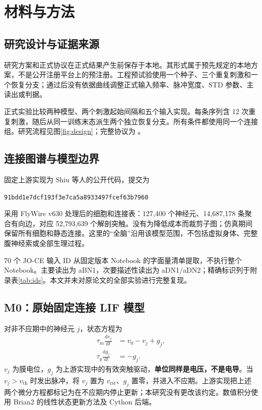 \section{材料与方法}
\label{sec:methods}
\subsection{研究设计与证据来源}
研究方案和正式协议在正式结果产生前保存于本地。其形式属于预先规定的本地方案，不是公开注册平台上的预注册。工程预试验使用一个种子、三个重复刺激和一个恢复分支；通过后没有依据曲线调整正式输入频率、脉冲宽度、STD 参数、主读出或判据。

正式实验比较两种模型、两个刺激起始间隔和五个输入实现。每条序列含 12 次重复刺激，随后从同一训练末态派生两个独立恢复分支。所有条件都使用同一个连接组。研究流程见图\ref{fig:design}；完整协议为 。



\subsection{连接图谱与模型边界}
固定上游实现为 Shiu 等人的公开代码\citep{shiu2024}，提交为
\begin{center}\small\texttt{91bdd1e7dcf193f3e7ca5a8933497fcef63b7960}\end{center}
采用 FlyWire v630 处理后的细胞和连接表：127,400 个神经元、14,687,178 条聚合有向边，对应 52,793,639 个解剖突触。没有为降低成本而裁剪子图；仿真期间保留所有细胞和静态连接。这里的“全脑”沿用该模型范围，不包括虚拟身体、完整腹神经索或全部生理过程。

70 个 JO-CE 输入 ID 从固定版本 Notebook 的字面量清单提取，不执行整个 Notebook。主要读出为 aBN1，次要描述性读出为 aDN1/aDN2；精确标识列于附录表\ref{tab:ids}。本文并未对原论文的全部实验进行完整复现。

\subsection{M0：原始固定连接 LIF 模型}
对非不应期中的神经元 $j$，状态方程为
\begin{align}
\tau_m\frac{\mathrm{d}v_j}{\mathrm{d}t}&=v_0-v_j+g_j,\label{eq:lif}\\
\tau_g\frac{\mathrm{d}g_j}{\mathrm{d}t}&=-g_j.\label{eq:g}
\end{align}
$v_j$ 为膜电位，$g_j$ 为上游实现中的有效突触驱动，\textbf{单位同样是电压，不是电导}。当 $v_j>v_{\mathrm{th}}$ 时发出脉冲，将 $v_j$ 置为 $v_{\mathrm{rst}}$、$g_j$ 置零，并进入不应期。上游实现把上述两个微分方程都标记为在不应期内停止更新；本研究没有更改该约定。数值积分使用 Brian2 的线性状态更新方法及 Cython 后端\citep{stimberg2019}。

